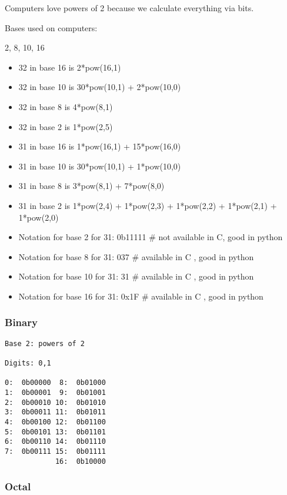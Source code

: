 \documentclass[11pt]{article}
\begin{document}
Computers love powers of 2 because we calculate everything via bits.

Bases used on computers:

2, 8, 10, 16

\begin{itemize}
\item 32 in base 16 is  2*pow(16,1)
\item 32 in base 10 is 30*pow(10,1) + 2*pow(10,0)
\item 32 in base 8 is   4*pow(8,1)
\item 32 in base 2 is   1*pow(2,5)

\item 31 in base 16 is  1*pow(16,1) + 15*pow(16,0)
\item 31 in base 10 is 30*pow(10,1) + 1*pow(10,0)
\item 31 in base 8 is   3*pow(8,1) + 7*pow(8,0)
\item 31 in base 2 is   1*pow(2,4) + 1*pow(2,3) + 1*pow(2,2) + 1*pow(2,1) + 1*pow(2,0)

\item Notation for base 2 for 31:  0b11111 \# not available in C, good in python
\item Notation for base 8 for 31:  037     \# available in C    , good in python
\item Notation for base 10 for 31: 31      \# available in C    , good in python
\item Notation for base 16 for 31: 0x1F    \# available in C    , good in python
\end{itemize}

\subsubsection{Binary}
\label{sec:org0e6fcd8}

\begin{verbatim}
Base 2: powers of 2

Digits: 0,1

0:  0b00000  8:  0b01000
1:  0b00001  9:  0b01001 
2:  0b00010 10:  0b01010 
3:  0b00011 11:  0b01011 
4:  0b00100 12:  0b01100
5:  0b00101 13:  0b01101
6:  0b00110 14:  0b01110         
7:  0b00111 15:  0b01111
            16:  0b10000
\end{verbatim}

\subsubsection{Octal}
\label{sec:orgfe20be2}
\end{document}

